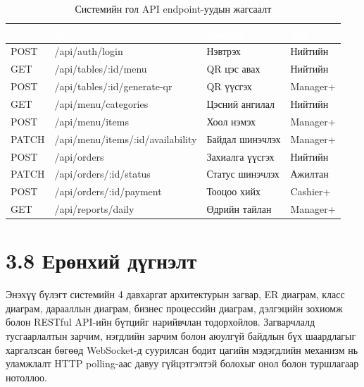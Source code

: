 \begin{table}[htbp]
\caption{Системийн гол API endpoint-уудын жагсаалт}
\label{tab:api}
\centering
\begin{tabularx}{\textwidth}{|l|X|X|l|}
\hline
\rowcolor{TableHeader}\textcolor{white}{\textbf{Метод}}
  & \textcolor{white}{\textbf{Зам}}
  & \textcolor{white}{\textbf{Тайлбар}}
  & \textcolor{white}{\textbf{Эрх}} \\ \hline
POST & /api/auth/login          & Нэвтрэх           & Нийтийн \\ \hline
GET  & /api/tables/:id/menu     & QR цэс авах       & Нийтийн \\ \hline
POST & /api/tables/:id/generate-qr & QR үүсгэх      & Manager+ \\ \hline
GET  & /api/menu/categories     & Цэсний ангилал    & Нийтийн \\ \hline
POST & /api/menu/items          & Хоол нэмэх        & Manager+ \\ \hline
PATCH& /api/menu/items/:id/availability & Байдал шинэчлэх & Manager+ \\ \hline
POST & /api/orders              & Захиалга үүсгэх   & Нийтийн \\ \hline
PATCH& /api/orders/:id/status   & Статус шинэчлэх   & Ажилтан \\ \hline
POST & /api/orders/:id/payment  & Тооцоо хийх       & Cashier+ \\ \hline
GET  & /api/reports/daily       & Өдрийн тайлан     & Manager+ \\ \hline
\end{tabularx}
\end{table}

\section{3.8 Ерөнхий дүгнэлт}

Энэхүү бүлэгт системийн 4 давхаргат архитектурын загвар, ER диаграм, класс диаграм,
дарааллын диаграм, бизнес процессийн диаграм, дэлгэцийн зохиомж болон RESTful
API-ийн бүтцийг нарийвчлан тодорхойлов. Загварчлалд тусгаарлалтын зарчим,
нэгдлийн зарчим болон аюулгүй байдлын бүх шаардлагыг харгалзсан бөгөөд
WebSocket-д суурилсан бодит цагийн мэдэгдлийн механизм нь уламжлалт
HTTP polling-аас давуу гүйцэтгэлтэй болохыг онол болон туршлагаар нотоллоо.
